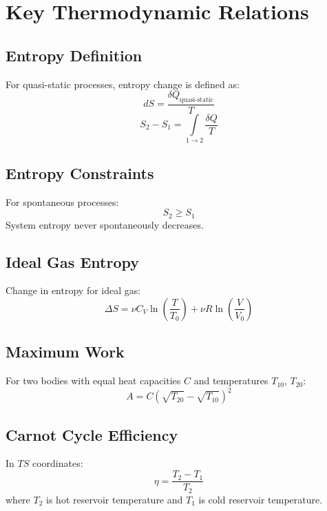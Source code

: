 \documentclass{article}
\begin{document}
\section*{Key Thermodynamic Relations}

\subsection*{Entropy Definition}
For quasi-static processes, entropy change is defined as:
\[dS=\frac{\delta Q_{\text{quasi-static}}}{T}\]
\[S_2-S_1=\int\limits_{1 \rightarrow 2}\frac{\delta Q}{T}\]

\subsection*{Entropy Constraints}
For spontaneous processes:
\[S_2\ge S_1\]
System entropy never spontaneously decreases.

\subsection*{Ideal Gas Entropy}
Change in entropy for ideal gas:
\[\Delta S=\nu C_V\ln\left(\frac{T}{T_0}\right)+\nu R\ln\left(\frac{V}{V_0}\right)\]

\subsection*{Maximum Work}
For two bodies with equal heat capacities $C$ and temperatures $T_{10}$, $T_{20}$:
\[A=C\left(\sqrt{T_{20}}-\sqrt{T_{10}}\right)^2\]

\subsection*{Carnot Cycle Efficiency}
In $TS$ coordinates:
\[\eta = \frac{T_2-T_1}{T_2}\]
where $T_2$ is hot reservoir temperature and $T_1$ is cold reservoir temperature.
\end{document}
